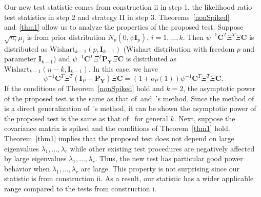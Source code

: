\documentclass[12pt]{article} %
\DeclareMathOperator{\mytr}{tr}
\DeclareMathOperator{\myE}{E}
\newcommand{\bX}{\mathbf{X}}
\newcommand{\bP}{\mathbf{P}}
\newcommand{\bY}{\mathbf{Y}}
\newcommand{\bC}{\mathbf{C}}
\newcommand{\bI}{\mathbf{I}}
\newcommand{\bfsym}[1]{\ensuremath{\boldsymbol{#1}}}
\def\bSigma {\bfsym {\Sigma}}
\theoremstyle{definition}
\begin{document}
Our new test statistic comes from construction ii in step 1, the likelihood ratio test statistics in step 2 and strategy II in step 3.
Theorems~\ref{nonSpiked} and~\ref{thm1} allow us to analyze the properties of the proposed test.
Suppose $\sqrt{n_i}\mu_i$ is from prior distribution $N_p(0,\psi \bI_p)$, $i=1,\ldots, k$.
Then $\psi^{-1}\bC^T \Xi^T \Xi \bC$ is distributed as $\text{Wishart}_{k-1}(p,\bI_{k-1})$ (Wishart distribution with freedom $p$ and parameter $\bI_{k-1}$) and $\psi^{-1}\bC^T \Xi^T \bP_{\bY}\Xi \bC$ is distributed as $\text{Wishart}_{k-1}(n-k,\bI_{k-1})$.
In this case, we have
$$
\psi^{-1}\bC^T \Xi^T (\bI_P-\bP_{\bY})\Xi \bC=
(1+o_P(1))\psi^{-1}\bC^T \Xi^T \Xi \bC.
$$
If the conditions of Theorem~\ref{nonSpiked} hold and $k=2$, the asymptotic power of the proposed test is the same as that of~\cite{Bai1996Efiect}and~\cite{Chen2010A}'s method.
Since the method of~\cite{Schott2007Some} is a direct generalization of~\cite{Bai1996Efiect}'s method, it can be shown the asymptotic power of the proposed test is the same as that of~\cite{Schott2007Some} for general $k$.
Next, suppose the covariance matrix is spiked and the conditions of Theorem~\ref{thm1} hold.
Theorem~\ref{thm1} implies that the proposed test does not depend on large eigenvalues $\lambda_1,\ldots,\lambda_r$ while other existing test procedures are negatively affected by large eigenvalues $\lambda_1,\ldots,\lambda_r$.   
Thus, the new test has particular good power behavior when $\lambda_1,\ldots,\lambda_r$ are large.
 This property is not surprising since our statistic is from construction ii.
As a result, our statistic has a wider applicable range compared to the tests from construction i.


%

\end{document}
